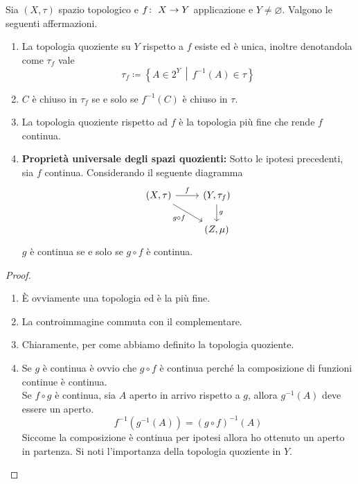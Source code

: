 \begin{theorem}
	Sia $(X, \tau)$ spazio topologico e $f \colon\ X \rightarrow Y$ applicazione e $Y \neq \varnothing$. Valgono le seguenti affermazioni.
	
	
	
	
	\begin{enumerate}
		\item La topologia quoziente su $Y$ rispetto a $f$ esiste ed è unica, inoltre denotandola come $\tau_f$ vale 
		\begin{equation*}
			\tau_f \coloneqq \left\{ A \in 2^Y \,\middle|\, f^{-1}(A) \in \tau \right\}
		\end{equation*}
		\item $C$ è chiuso in $\tau_f$ se e solo se $f^{-1}(C)$ è chiuso in $\tau$.
		\item La topologia quoziente rispetto ad $f$ è la topologia più fine che rende $f$ continua.
		\item \textbf{Proprietà universale degli  spazi quozienti:} Sotto le ipotesi precedenti, sia $f$ continua. Considerando il seguente diagramma 
		\begin{equation*}
		\begin{tikzcd}
		(X, \tau) \arrow[swap]{rd}{g\circ f} \arrow{r}{f} & (Y, \tau_f) \arrow{d}{g} \\
		& (Z, \mu) 
		\end{tikzcd}
		\end{equation*}
		$g$ è continua se e solo se $g \circ f$ è continua. 
	\end{enumerate}
\end{theorem}
\begin{proof} \
	\begin{enumerate}
		\item È ovviamente una topologia ed è la più fine. 
		\item La controimmagine commuta con il complementare. 
		\item Chiaramente, per come abbiamo definito la topologia quoziente.
		\item Se $g$ è continua è ovvio che $g \circ f$ è continua perché la composizione di funzioni continue è continua. \\ Se $f\circ g$ è continua, sia $A$ aperto  in arrivo rispetto a $g$, allora $g^{-1}(A)$ deve essere un aperto. 
		\begin{equation*}
		f^{-1}\left(g^{-1}(A)\right)=\left(g \circ f\right)^{-1}(A)
		\end{equation*}
		Siccome la composizione è continua per ipotesi allora ho ottenuto un aperto in partenza. Si noti l'importanza della topologia quoziente in $Y$.
	\end{enumerate}
\end{proof}

